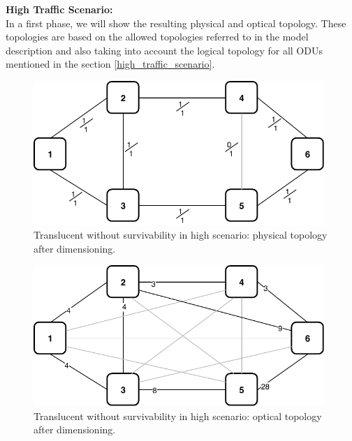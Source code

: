 \newpage
\textbf{High Traffic Scenario:}\\

In a first phase, we will show the resulting physical and optical topology. These topologies are based on the allowed topologies referred to in the model description and also taking into account the logical topology for all ODUs mentioned in the section \ref{high_traffic_scenario}.\\

\begin{figure}[h!]
\centering
\includegraphics[width=11cm]{sdf/ilp/translucent_survivability/figures/physical_topology_high}
\caption{Translucent without survivability in high scenario: physical topology after dimensioning.}
\label{physical3_high}
\end{figure}

\begin{figure}[h!]
\centering
\includegraphics[width=11cm]{sdf/ilp/translucent_survivability/figures/optical_topology_high}
\caption{Translucent without survivability in high scenario: optical topology after dimensioning.}
\label{optical3_high}
\end{figure}

